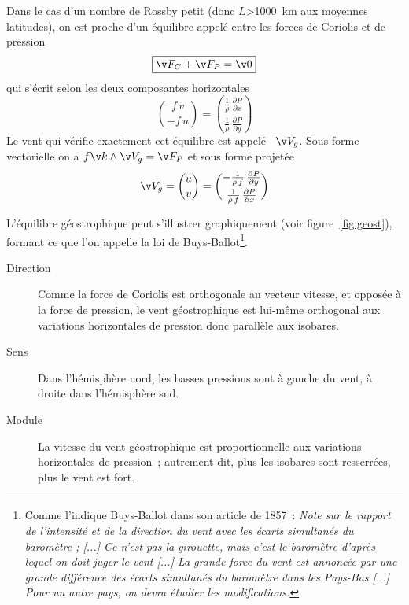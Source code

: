 \sk
Dans le cas d'un nombre de Rossby petit (donc $L$>1000~km aux moyennes latitudes), on est proche d'un équilibre appelé  entre les forces de Coriolis et de pression
\[ \boxed{ \v F_C+\v F_P=\v 0 } \]
qui s'écrit selon les deux composantes horizontales
\[ \boxed{ \binom{f \, v}{-f \, u} = \binom{\frac{1}{\rho} \,\frac{\partial P}{\partial x}}{\frac{1}{\rho} \,\frac{\partial P}{\partial y}} } \]
Le vent qui vérifie exactement cet équilibre est appelé ~$\v V_g$. Sous forme vectorielle on a $f\v k\wedge\v V_g=\v F_P$ et sous forme projetée
\[ \v V_g = \binom{u}{v} = \binom{- \frac{1}{\rho \, f} \, \frac{\partial P}{\partial y}}{\frac{1}{\rho \, f} \, \frac{\partial P}{\partial x}} \]


\sk
L'équilibre géostrophique peut s'illustrer graphiquement (voir figure~\ref{fig:geost}), formant ce que l'on appelle la loi de Buys-Ballot\footnote{Comme l'indique Buys-Ballot dans son article de 1857~: \emph{Note sur le rapport de l'intensité et de la direction du vent avec les écarts simultanés du baromètre ; [...] Ce n'est pas la girouette, mais c'est le baromètre d'après lequel on doit juger le vent [...] La grande force du vent est annoncée par une grande différence des écarts simultanés du baromètre dans les Pays-Bas [...] Pour un autre pays, on devra étudier les modifications.}}.
\begin{description}
\item[Direction] Comme la force de Coriolis est orthogonale au vecteur vitesse, et opposée à la force de pression, le vent géostrophique est lui-même orthogonal aux variations horizontales de pression donc parallèle aux isobares.
\item[Sens] Dans l'hémisphère nord, les basses pressions sont à gauche du vent, à droite dans l'hémisphère sud.
\item[Module] La vitesse du vent géostrophique est proportionnelle aux variations horizontales de pression~; autrement dit, plus les isobares sont resserrées, plus le vent est fort.
\end{description}

